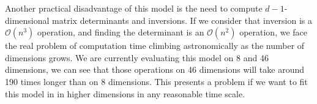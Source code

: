 Another practical disadvantage of this model is the need to compute $d-1$-dimensional matrix
  determinants and inversions.  If we consider that inversion is a $\mathcal{O}(n^3)$ operation, and
  finding the determinant is an $\mathcal{O}(n^2)$ operation, we face the real problem of computation
  time climbing astronomically as the number of dimensions grows.  We are currently evaluating this
  model on 8 and 46 dimensions, we can see that those operations on 46 dimensions will take around
  190 times longer than on 8 dimensions.  This presents a problem if we want to fit this model in
  in higher dimensions in any reasonable time scale.

